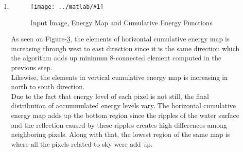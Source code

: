 \documentclass{article}
\newcommand{\listFigure}[3]{
	\begin{figure}[H]
		\texttt{[image: ../matlab/\#1]}
		\caption{#2\label{fig:#3}}
	\end{figure}		
}
\begin{document}
\begin{enumerate}
\begin{enumerate}
		\item Mall (Height Resizing) \\
		\begin{enumerate}
			\item Originial Image: Please see Figure-\ref{fig:inputSeamCarvingMall} \\
			\item Resized Image: \\
			\listFigure{outputReduceHeightMall.png}{Resized Image (Mall, Height, 775
			$\times$ 669)}{outputReduceHeightMall}
			\pagebreak
			\item Comparison: \\
			\listFigure{outputReduceHeightComparisonOutputsMall.png}{Comparison of Input Image and Output of Dynamic Programming
				Implementation}{outputReduceHeightComparisonOutputsMall}
			Legend for comparison image.
			\begin{itemize}
				\item Gray pixels: Common (shared) pixels on both images.
				\item Green pixels: The pixels that output image introduces.
				\item Magenta pixels: The pixels that output image lacks.
			\end{itemize}
		\end{enumerate}
		\pagebreak 
		\item Script: SeamCarvingReduceHeight.m
		
	\end{enumerate}

	\item 
	\listFigure{cumulatives.png}{Input Image, Energy Map and
	Cumulative Energy Functions}{cumulatives}	
	As seen on Figure-\ref{fig:cumulatives}, the elements of horizontal cumulative
	energy map is increasing through west to east direction since it is the same
	direction which the algorithm adds up minimum 8-connected element computed in the previous step. \\
	Likewise, the elements in vertical cumulative energy map is increasing in
	north to south direction. \\
	Due to the fact that energy level of each pixel is not still, the final
	distribution of accummulated energy levels vary. The horizontal cumulative
	energy map adds up the bottom region since the ripples of the water surface
	and the reflection caused by these ripples creates high differences among
	neighboring pixels. Along with that, the lowest region of the same map is
	where all the pixels related to sky were add up.
	\pagebreak


\end{enumerate}
\end{document}
